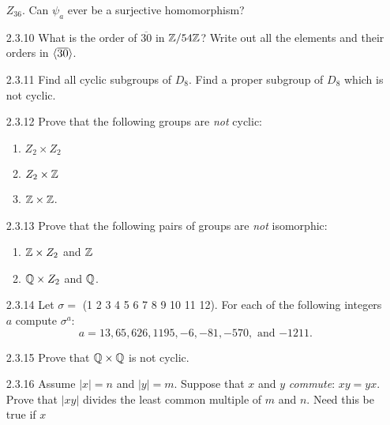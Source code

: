 \begin{enumerate}
                  $Z_{36}$. Can $\psi_a$ ever be a surjective homomorphism?
   \item[2.3.10]  What is the order of $\overline{30}$ in $\mathbb{Z}/54\mathbb{Z}$? Write out
                  all the elements and their orders in $\langle \overline{30} \rangle$.
   \item[2.3.11]  Find all cyclic subgroups of $D_8$. Find a proper subgroup of
                  $D_8$ which is not cyclic.
   \item[2.3.12]  Prove that the following groups are \textit{not} cyclic:
                  \begin{enumerate}
                     \item $Z_2 \times Z_2$
                     \item $Z_2 \times \mathbb{Z}$
                     \item $\mathbb{Z} \times \mathbb{Z}$.
                  \end{enumerate}
   \item[2.3.13]  Prove that the following pairs of groups are \textit{not}
                  isomorphic:
                  \begin{enumerate}
                     \item $\mathbb{Z} \times Z_2$ and $\mathbb{Z}$
                     \item $\mathbb{Q} \times Z_2$ and $\mathbb{Q}$.
                  \end{enumerate}
   \item[2.3.14]  Let $\sigma =$ (1 2 3 4 5 6 7 8 9 10 11 12). For each of the
                  following integers $a$ compute $\sigma^a$:
                  $$a = 13, 65, 626, 1195, -6, -81, -570,\text{ and } {-1211}.$$
   \item[2.3.15]  Prove that $\mathbb{Q} \times \mathbb{Q}$ is not cyclic.
   \item[2.3.16]  Assume $|x| = n$ and $|y| = m$. Suppose that $x$ and $y$
                  \textit{commute}: $xy = yx$. Prove that $|xy|$ divides the
                  least common multiple of $m$ and $n$. Need this be true if $x$

\end{enumerate}
